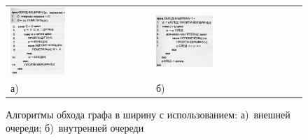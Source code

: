 \begin{figure}[h!]
    \centering
\begin{tabular}{P{0.5\textwidth}P{0.5\textwidth}}
  \includegraphics[width=0.4\textwidth]{ResearchNotes/rndhpc_int_edt_2023_01_10/outer_queue.png} &
  \includegraphics[width=0.4\textwidth]{ResearchNotes/rndhpc_int_edt_2023_01_10/internal_queue.png} \\
    а) & б) \\
\end{tabular}
    \caption{Алгоритмы обхода графа в ширину с использованием: а)~внешней очереди; б)~внутренней очереди}\label{fig:queue}
\end{figure}

\noteattributes{} 